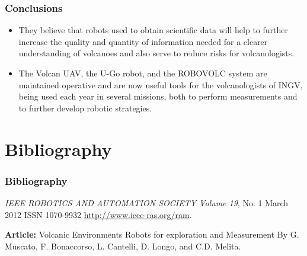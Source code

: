 \documentclass[xcolor=svgnames]{beamer}
\begin{document}
\begin{frame}
\frametitle{Conclusions}
\begin{itemize}
 \item They believe that robots used to obtain scientific data will help to further increase the quality and quantity of information needed for a clearer understanding of volcanoes and also serve to reduce risks for volcanologists. \pause
 \item The Volcan UAV, the U-Go robot, and the ROBOVOLC system are maintained operative and are now useful tools for the volcanologists of INGV, being used each year in several missions, both to perform measurements and to further develop robotic strategies.
\end{itemize}
\end{frame}

\section{Bibliography}
\begin{frame}
\frametitle{Bibliography}
\begin{thebibliography}{10}
 \textit{IEEE ROBOTICS AND AUTOMATION SOCIETY Volume 19}, No. 1 March 2012 ISSN 1070-9932 \url{http://www.ieee-ras.org/ram}.

 \textbf{Article:} Volcanic Environments Robots for exploration and Measurement
 By G. Muscato, F. Bonaccorso, L. Cantelli, D. Longo, and C.D. Melita.
\end{thebibliography}
\end{frame} 
\end{document}
